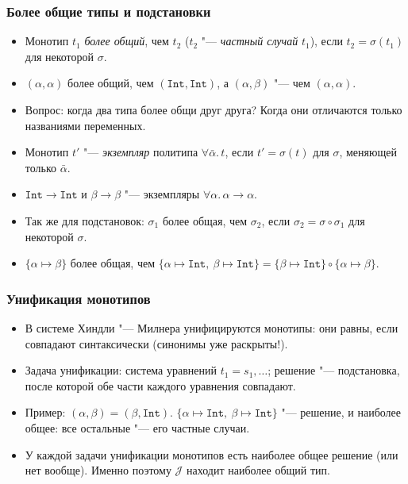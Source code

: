 \documentclass[11pt]{beamer}
\newcommand{\tInt}{\mathtt{Int}}
\begin{document}
\begin{frame}[fragile]
  \frametitle{Более общие типы и подстановки}
  \begin{itemize}
    \item Монотип $t_1$ \emph{более общий}, чем $t_2$ ($t_2$ "--- \emph{частный случай} $t_1$), если $t_2 = \sigma(t_1)$ для некоторой $\sigma$.
          \pause
    \item $(\alpha, \alpha)$ более общий, чем $(\tInt, \tInt)$, а $(\alpha, \beta)$ "--- чем $(\alpha, \alpha)$.
          \pause
    \item Вопрос: когда два типа более общи друг друга? \pause Когда они отличаются только названиями переменных.
          \pause
    \item Монотип $t'$ "--- \emph{экземпляр} политипа $\forall\bar\alpha.\,t$, если $t' = \sigma(t)$ для $\sigma$, меняющей только $\bar\alpha$.
    \item $\tInt \to \tInt$ и $\beta \to \beta$ "--- экземпляры $\forall\alpha.\,\alpha \to \alpha$.
          \pause
    \item Так же для подстановок: $\sigma_1$ более общая, чем $\sigma_2$, если $\sigma_2 = \sigma \circ \sigma_1$ для некоторой $\sigma$.
          \pause
    \item $\{\alpha \mapsto \beta\}$ более общая, чем $\{\alpha \mapsto \tInt,\ \beta \mapsto \tInt\} = \{\beta \mapsto \tInt\} \circ \{\alpha \mapsto \beta\}$.
  \end{itemize}
\end{frame}

\begin{frame}[fragile]
  \frametitle{Унификация монотипов}
  \begin{itemize}
    \item В системе Хиндли "--- Милнера унифицируются монотипы: они равны, если совпадают синтаксически (синонимы уже раскрыты!).
    \item Задача унификации: система уравнений $t_1 = s_1, \ldots$; решение "--- подстановка, после которой обе части каждого уравнения совпадают.
          \pause
    \item Пример: $(\alpha, \beta) = (\beta, \tInt)$. \pause $\{\alpha \mapsto \tInt,\ \beta \mapsto \tInt\}$ "--- решение, \pause и наиболее общее: все остальные "--- его частные случаи.
          \pause
    \item У каждой задачи унификации монотипов есть наиболее общее решение (или нет вообще). \pause Именно поэтому $\mathcal{J}$ находит наиболее общий тип.
  \end{itemize}
\end{frame}
\end{document}
